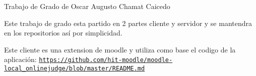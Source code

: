 Trabajo de Grado de Oscar Augusto Chamat Caicedo

Este trabajo de grado esta partido en 2 partes cliente y servidor y se mantendra en los repositorios así por simplicidad.

Este cliente es una extension de moodle y utiliza como base el codigo de la aplicación\-: \href{https://github.com/hit-moodle/moodle-local_onlinejudge/blob/master/README.md}{\tt https\-://github.\-com/hit-\/moodle/moodle-\/local\-\_\-onlinejudge/blob/master/\-R\-E\-A\-D\-M\-E.\-md} 